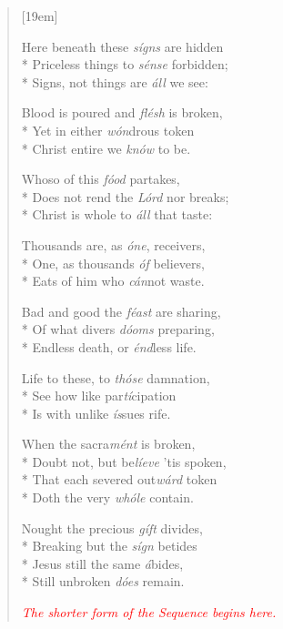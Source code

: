 \documentclass[12pt]{memoir}
\begin{document}
\begin{multicols}{2}
\begin{verse}[19em]

Here beneath these \textit{s\'{i}gns} are hidden \\*
Priceless things to \textit{s\'{e}nse} forbidden; \\*
Signs, not things are \textit{\'{a}ll} we see:

Blood is poured and \textit{fl\'{e}sh} is broken, \\*
Yet in either \textit{w\'{o}n}drous token \\*
Christ entire we \textit{kn\'{o}w} to be.

Whoso of this \textit{f\'{o}od} partakes, \\*
Does not rend the \textit{L\'{o}rd} nor breaks; \\*
Christ is whole to \textit{\'{a}ll} that taste:

Thousands are, as \textit{\'{o}ne}, receivers, \\*
One, as thousands \textit{\'{o}f} believers, \\*
Eats of him who \textit{c\'{a}n}not waste.

Bad and good the \textit{f\'{e}ast} are sharing, \\*
Of what divers \textit{d\'{o}oms} preparing, \\*
Endless death, or \textit{\'{e}nd}less life.

Life to these, to \textit{th\'{o}se} damnation, \\*
See how like par\textit{t\'{i}}cipation \\*
Is with unlike \textit{\'{i}s}sues rife.

When the sacra\textit{m\'{e}nt} is broken, \\*
Doubt not, but be\textit{l\'{i}eve} 'tis spoken, \\*
That each severed out\textit{w\'{a}rd} token \\*
Doth the very \textit{wh\'{o}le} contain.

\columnbreak

Nought the precious \textit{g\'{i}ft} divides, \\*
Breaking but the \textit{s\'{i}gn} betides \\*
Jesus still the same \textit{\'{a}}bides, \\*
Still unbroken \textit{d\'{o}es} remain.

\textcolor{red}{\textit{The shorter form of the Sequence begins here.}}


\end{verse}
\end{multicols}
\end{document}
